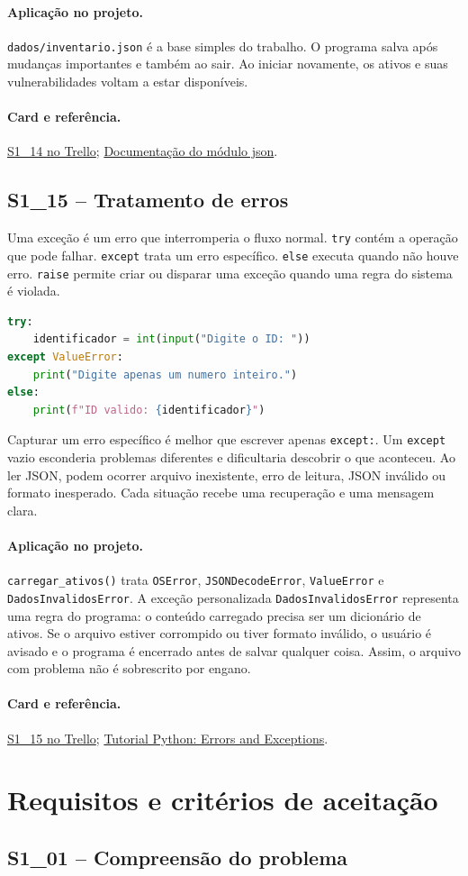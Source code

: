 \documentclass[11pt,a4paper]{article}
\newcommand{\projeto}{\paragraph{Aplicação no projeto.}}
\newcommand{\referencia}[2]{\paragraph{Card e referência.}\href{#1}{#2}}
\newcommand{\cardsection}[1]{\Needspace{12\baselineskip}\subsection{#1}}
\begin{document}
\projeto
\texttt{dados/inventario.json} é a base simples do trabalho. O programa salva após mudanças importantes e também ao sair. Ao iniciar novamente, os ativos e suas vulnerabilidades voltam a estar disponíveis.

\referencia{https://trello.com/c/xdRh1TRi}{S1\_14 no Trello}; \href{https://docs.python.org/3/library/json.html}{Documentação do módulo json}.

\cardsection{S1\_15 -- Tratamento de erros}

Uma exceção é um erro que interromperia o fluxo normal. \texttt{try} contém a operação que pode falhar. \texttt{except} trata um erro específico. \texttt{else} executa quando não houve erro. \texttt{raise} permite criar ou disparar uma exceção quando uma regra do sistema é violada.

\begin{lstlisting}[language=Python,caption={Tratamento de erro de conversão}]
try:
    identificador = int(input("Digite o ID: "))
except ValueError:
    print("Digite apenas um numero inteiro.")
else:
    print(f"ID valido: {identificador}")
\end{lstlisting}

Capturar um erro específico é melhor que escrever apenas \texttt{except:}. Um \texttt{except} vazio esconderia problemas diferentes e dificultaria descobrir o que aconteceu. Ao ler JSON, podem ocorrer arquivo inexistente, erro de leitura, JSON inválido ou formato inesperado. Cada situação recebe uma recuperação e uma mensagem clara.

\projeto
\texttt{carregar\_ativos()} trata \texttt{OSError}, \texttt{JSONDecodeError}, \texttt{ValueError} e \texttt{DadosInvalidosError}. A exceção personalizada \texttt{DadosInvalidosError} representa uma regra do programa: o conteúdo carregado precisa ser um dicionário de ativos. Se o arquivo estiver corrompido ou tiver formato inválido, o usuário é avisado e o programa é encerrado antes de salvar qualquer coisa. Assim, o arquivo com problema não é sobrescrito por engano.

\referencia{https://trello.com/c/qSZwgosj}{S1\_15 no Trello}; \href{https://docs.python.org/3/tutorial/errors.html}{Tutorial Python: Errors and Exceptions}.

\section{Requisitos e critérios de aceitação}

\cardsection{S1\_01 -- Compreensão do problema}
\end{document}
